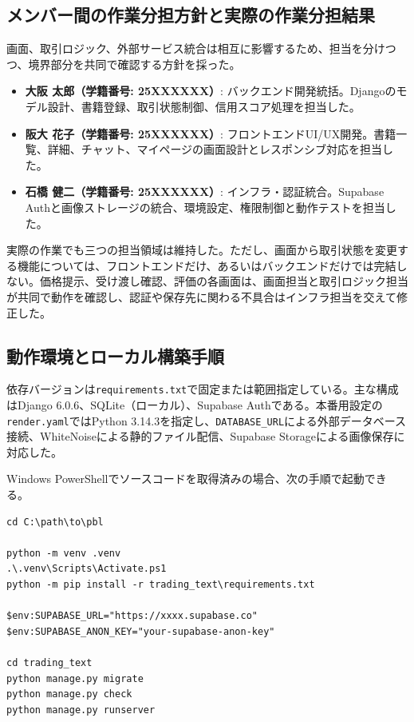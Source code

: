 \documentclass[11pt,a4paper]{jsarticle}
\begin{document}
\subsection{メンバー間の作業分担方針と実際の作業分担結果}
画面、取引ロジック、外部サービス統合は相互に影響するため、担当を分けつつ、境界部分を共同で確認する方針を採った。
\begin{itemize}
    \item \textbf{大阪 太郎（学籍番号: 25XXXXXX）}: バックエンド開発統括。Djangoのモデル設計、書籍登録、取引状態制御、信用スコア処理を担当した。
    \item \textbf{阪大 花子（学籍番号: 25XXXXXX）}: フロントエンドUI/UX開発。書籍一覧、詳細、チャット、マイページの画面設計とレスポンシブ対応を担当した。
    \item \textbf{石橋 健二（学籍番号: 25XXXXXX）}: インフラ・認証統合。Supabase Authと画像ストレージの統合、環境設定、権限制御と動作テストを担当した。
\end{itemize}

実際の作業でも三つの担当領域は維持した。ただし、画面から取引状態を変更する機能については、フロントエンドだけ、あるいはバックエンドだけでは完結しない。価格提示、受け渡し確認、評価の各画面は、画面担当と取引ロジック担当が共同で動作を確認し、認証や保存先に関わる不具合はインフラ担当を交えて修正した。

\subsection{動作環境とローカル構築手順}
依存バージョンは\texttt{requirements.txt}で固定または範囲指定している。主な構成はDjango 6.0.6、SQLite（ローカル）、Supabase Authである。本番用設定の\texttt{render.yaml}ではPython 3.14.3を指定し、\texttt{DATABASE\_URL}による外部データベース接続、WhiteNoiseによる静的ファイル配信、Supabase Storageによる画像保存に対応した。

Windows PowerShellでソースコードを取得済みの場合、次の手順で起動できる。
\begin{lstlisting}
cd C:\path\to\pbl

python -m venv .venv
.\.venv\Scripts\Activate.ps1
python -m pip install -r trading_text\requirements.txt

$env:SUPABASE_URL="https://xxxx.supabase.co"
$env:SUPABASE_ANON_KEY="your-supabase-anon-key"

cd trading_text
python manage.py migrate
python manage.py check
python manage.py runserver
\end{lstlisting}
\end{document}
